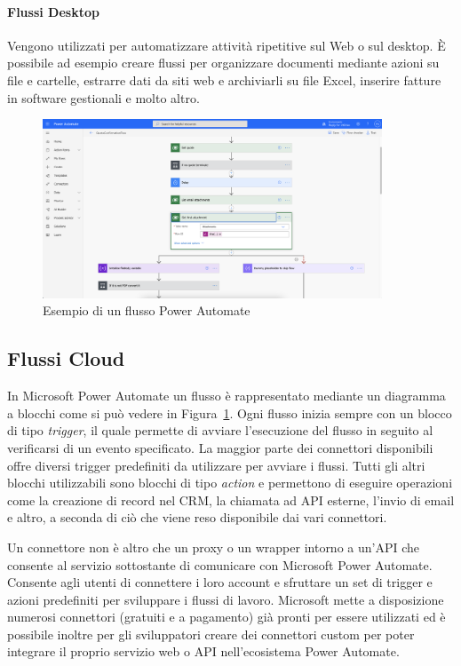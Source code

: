 \paragraph{Flussi Desktop} Vengono utilizzati per automatizzare attività ripetitive sul Web o sul desktop. È possibile ad esempio creare flussi per organizzare documenti mediante azioni su file e cartelle, estrarre dati da siti web e archiviarli su file Excel, inserire fatture in software gestionali e molto altro.

\begin{figure}[ht!]
  \centering
  \includegraphics[width=0.9\textwidth]{flow-example.png}
  \caption{Esempio di un flusso Power Automate}
  \label{fig:flowExample}
\end{figure}

\subsection{Flussi Cloud}
In Microsoft Power Automate un flusso è rappresentato mediante un diagramma a blocchi come si può vedere in Figura~\ref{fig:flowExample}. Ogni flusso inizia sempre con un blocco di tipo \textit{trigger}, il quale permette di avviare l'esecuzione del flusso in seguito al verificarsi di un evento specificato. La maggior parte dei connettori disponibili offre diversi trigger predefiniti da utilizzare per avviare i flussi. Tutti gli altri blocchi utilizzabili sono blocchi di tipo \textit{action} e permettono di eseguire operazioni come la creazione di record nel CRM, la chiamata ad API esterne, l'invio di email e altro, a seconda di ciò che viene reso disponibile dai vari connettori.

Un connettore non è altro che un proxy o un wrapper intorno a un'API che consente al servizio sottostante di comunicare con Microsoft Power Automate. Consente agli utenti di connettere i loro account e sfruttare un set di trigger e azioni predefiniti per sviluppare i flussi di lavoro. Microsoft mette a disposizione numerosi connettori (gratuiti e a pagamento) già pronti per essere utilizzati ed è possibile inoltre per gli sviluppatori creare dei connettori custom per poter integrare il proprio servizio web o API nell'ecosistema Power Automate.

